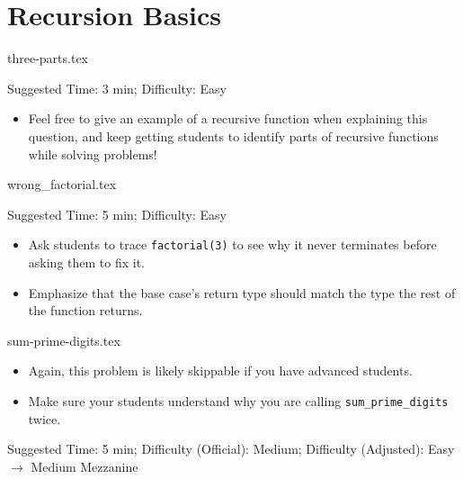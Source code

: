 \documentclass{exam}
\begin{document}
\section{Recursion Basics}
\begin{questions}
    {three-parts.tex}
    \begin{questionmeta}
        Suggested Time: 3 min; Difficulty: Easy
        \begin{itemize}
            \item Feel free to give an example of a recursive function when explaining this question, and keep getting students to identify parts of recursive functions while solving problems!
        \end{itemize}
    \end{questionmeta}

    {wrong_factorial.tex}
    \begin{questionmeta}
        Suggested Time: 5 min; Difficulty: Easy
        \begin{itemize}
            \item Ask students to trace \lstinline{factorial(3)} to see why it never terminates before asking them to fix it.
            \item Emphasize that the base case's return type should match the type the rest of the function returns.
        \end{itemize}
    \end{questionmeta}

    {sum-prime-digits.tex}
    \begin{questionmeta}
        \begin{itemize}
            \item Again, this problem is likely skippable if you have advanced students.
            \item Make sure your students understand why you are calling \lstinline{sum_prime_digits} twice.
        \end{itemize}    
        Suggested Time: 5 min; Difficulty (Official): Medium; Difficulty (Adjusted): Easy $\rightarrow$ Medium Mezzanine
      \end{questionmeta}
\end{questions}

\newpage
\end{document}
